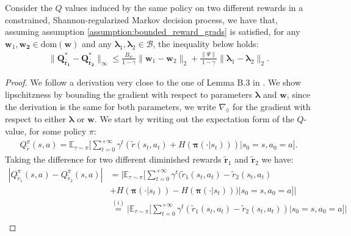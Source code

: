 \begin{lemma}
    \label{lemma:sameQ_is_lipschitz_wrt_w}
    Consider the $Q$ values induced by the same policy on two different rewards in a constrained, Shannon-regularized Markov decision process, we have that, assuming assumption \ref{assumption:bounded_reward_grads} is satisfied, for any $\bm{w}_1,\bm{w_2} \in \text{dom}(\bm{w})$ and any $\bm{\lambda}_1,\bm{\lambda}_2\in\mathcal{B}$, the inequality below holds:
    \begin{align*}
        \| \bm{Q}^{*}_{\tilde{\bm{r_1}}} - \bm{Q}^{*}_{\tilde{\bm{r_2}}} \|_\infty  
        \leq \frac{B_w}{1 - \gamma} \| \bm{w}_1 - \bm{w}_2 \|_2 + \frac{\|\Psi\|}{1 - \gamma} \| \bm{\lambda}_1 - \bm{\lambda}_2 \|_2.
    \end{align*}
    \begin{proof}
        We follow a derivation very close to the one of Lemma B.3 in \cite{Zeng2022}. We show lipschitzness by bounding the gradient with respect to parameters $\bm{\lambda}$ and $\bm{w}$, since the derivation is the same for both parameters, we write $\nabla_\lozenge$ for the gradient with respect to either $\bm{\lambda}$ or $\bm{w}$. We start by writing out the expectation form of the $Q$-value, for some policy $\pi$:
        \begin{align*}
            Q_{\tilde{r}}^\pi(s,a) =
            \mathbb{E}_{\tau \sim \pi}\Bigg[ 
                \sum_{t=0}^{+\infty} \gamma^t (\tilde{r}(s_t,a_t)+H(\bm{\pi}(\cdot|s_t))) 
                \Bigg| s_0 =s, a_0 = a
            \Bigg].
        \end{align*}
        Taking the difference for two different diminished rewards $\tilde{\bm{r}}_1$ and  $\tilde{\bm{r}}_2$ we have:
        \begin{align*}
            |Q_{\tilde{r}_1}^\pi(s,a) - Q_{\tilde{r}_2}^\pi(s,a)|
            &=
            \Bigg|
            \mathbb{E}_{\tau \sim \pi}\Bigg[ 
                \sum_{t=0}^{+\infty} \gamma^t (\tilde{r}_1(s_t,a_t)-\tilde{r}_2(s_t,a_t)\\ &+H(\bm{\pi}(\cdot|s_t))-H(\bm{\pi}(\cdot|s_t))) 
                \Bigg| s_0 =s, a_0 = a
            \Bigg]
            \Bigg|\\
            &\stackrel{(i)}{=}
            \Bigg|
            \mathbb{E}_{\tau \sim \pi}\Bigg[ 
                \sum_{t=0}^{+\infty} \gamma^t (\tilde{r}_1(s_t,a_t)-\tilde{r}_2(s_t,a_t))
                \Bigg| s_0 =s, a_0 = a
            \Bigg]
            \Bigg|\\

\end{align*}
\end{proof}
\end{lemma}
